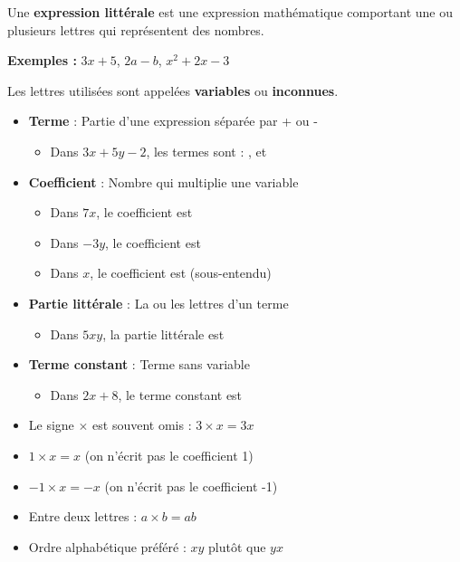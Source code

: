 \begin{definitionbox}
	Une \textbf{expression littérale} est une expression mathématique comportant une ou plusieurs lettres qui représentent des nombres.
	
	\textbf{Exemples :} $3x + 5$, $2a - b$, $x^2 + 2x - 3$
	
	Les lettres utilisées sont appelées \textbf{variables} ou \textbf{inconnues}.
\end{definitionbox}

\begin{vocabulairebox}
	\begin{itemize}
		\item \textbf{Terme} : Partie d'une expression séparée par + ou -
		\begin{itemize}
			\item[\textbullet] Dans $3x + 5y - 2$, les termes sont : ,  et 
		\end{itemize}
		\item \textbf{Coefficient} : Nombre qui multiplie une variable
		\begin{itemize}
			\item[\textbullet] Dans $7x$, le coefficient est 
			\item[\textbullet] Dans $-3y$, le coefficient est 
			\item[\textbullet] Dans $x$, le coefficient est  (sous-entendu)
		\end{itemize}
		\item \textbf{Partie littérale} : La ou les lettres d'un terme
		\begin{itemize}
			\item[\textbullet] Dans $5xy$, la partie littérale est 
		\end{itemize}
		\item \textbf{Terme constant} : Terme sans variable
		\begin{itemize}
			\item[\textbullet] Dans $2x + 8$, le terme constant est 
		\end{itemize}
	\end{itemize}
\end{vocabulairebox}

\begin{remarkbox}
	\begin{itemize}
		\item[\textbullet] Le signe $\times$ est souvent omis : $3 \times x = 3x$
		\item[\textbullet] $1 \times x = x$ (on n'écrit pas le coefficient 1)
		\item[\textbullet] $-1 \times x = -x$ (on n'écrit pas le coefficient -1)
		\item[\textbullet] Entre deux lettres : $a \times b = ab$
		\item[\textbullet] Ordre alphabétique préféré : $xy$ plutôt que $yx$
	\end{itemize}
\end{remarkbox}

